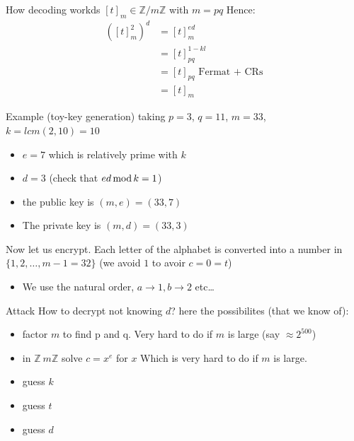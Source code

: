 \begin{parag}{ How decoding workds}
    $ \left[t\right]_m \in \mathbb{Z} / m \mathbb{Z} $ with $m = pq$ Hence:
    \begin{align*} \left(\left[t\right]_m^2\right)^d &= \left[t\right]_m^{ed}\\
    &= \left[t\right]_{pq}^{1 - kl}\\
    &=\left[t\right]_{pq} \text{ Fermat + CRs}\\
    &= \left[t\right]_m
    \end{align*}
    
\end{parag}
\begin{parag}{Example (toy-key generation)}
    taking $p = 3$, $q = 11$, $m = 33$, $k = lcm\left(2, 10\right) = 10$
    \begin{itemize}
        \item $e = 7$ which is relatively prime with $k$
        \item $d = 3$ (check that $ed \operatorname{mod} k = 1$)
        \item the public key is $\left(m, e\right) = \left(33, 7\right)$
        \item The private key is $\left(m, d\right) = \left(33, 3\right)$
    \end{itemize}
    
    Now let us encrypt. Each letter of the alphabet is converted into a number in $\{1, 2, \ldots, m-1 = 32\}$ (we avoid $1$ to avoir $c = 0 = t$)
    \begin{itemize}
        \item We use the natural order, $a \to 1, b \to 2$ etc\ldots
    \end{itemize}
    
    
\end{parag}
\begin{parag}{Attack}
    How to decrypt not knowing $d$? here the possibilites (that we know of):
    \begin{itemize}
        \item factor $m$ to find p and q. Very hard to do if $m$ is large (say $\approx 2^{500}$)
        \item in $\mathbb{Z} \ m \mathbb{Z}$ solve $c = x^e$ for $x$ Which is very hard to do if $m$ is large.
        \item guess $k$
        \item guess $t$
        \item guess $d$
    \end{itemize}
    
    
\end{parag}
